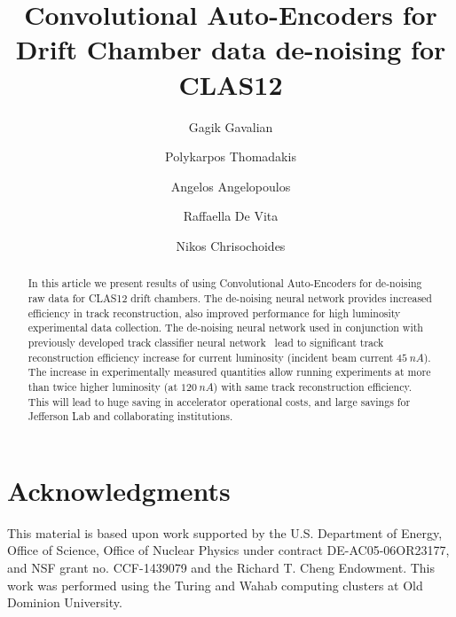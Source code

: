 \documentclass[preprint,12pt]{elsarticle}
\title{Convolutional Auto-Encoders for Drift Chamber data de-noising for CLAS12}
\author[1]{Gagik Gavalian}
\author[2]{Polykarpos Thomadakis}
\author[2]{Angelos Angelopoulos}
\author[3]{Raffaella De Vita}
\author[2]{Nikos Chrisochoides}
\begin{document}
\begin{abstract}
In this article we present results of using Convolutional Auto-Encoders for de-noising raw data for CLAS12 drift chambers.
The de-noising neural network provides increased efficiency in track reconstruction, also improved performance for high 
luminosity experimental data collection. The de-noising neural network used in conjunction with previously developed track 
classifier neural network~\cite{Gavalian:2022hfa} lead to significant track reconstruction efficiency increase for current luminosity
(incident beam current $45~nA$). The increase in experimentally measured quantities allow running experiments at more than 
twice higher luminosity (at $120~nA$) with same track reconstruction efficiency. This will lead to huge saving in accelerator 
operational costs, and large savings for Jefferson Lab and collaborating institutions.
\end{abstract}
\maketitle














%
%



\newpage

\section{Acknowledgments}

This material is based upon work supported by the U.S. Department of Energy, Office of Science,
Office of Nuclear Physics under contract DE-AC05-06OR23177, and NSF grant no. CCF-1439079 and
the Richard T. Cheng Endowment. This work was performed using the Turing and Wahab computing
clusters at Old Dominion University.
 
\newpage


\end{document}
